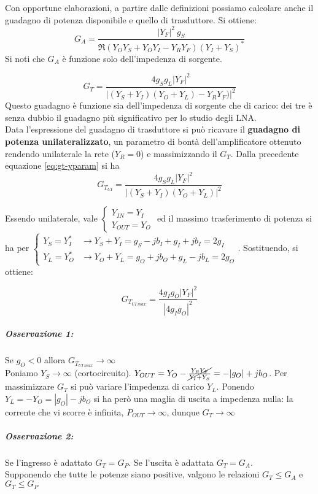 Con opportune elaborazioni, a partire dalle definizioni possiamo calcolare anche il guadagno di potenza disponibile e quello di trasduttore. Si ottiene:
      \[G_A = \frac{|Y_F|^2 ~ g_S}{\Re{ (Y_O Y_S + Y_O Y_I - Y_R Y_F)(Y_I + Y_S)^*}}\]
      Si noti che $G_A$ è funzione solo dell'impedenza di sorgente.
      
\begin{equation}
G_T = \frac{4 g_S g_L |Y_F|^2}{|(Y_S + Y_I) (Y_O + Y_L) - Y_R Y_F)|^2}
\label{eq:gt-yparam}
\end{equation}
  Questo guadagno è funzione sia dell'impedenza di sorgente che di carico: dei tre è senza dubbio il guadagno più significativo per lo studio degli LNA.
  \\Data l'espressione del guadagno di trasduttore si può ricavare il \textbf{guadagno di potenza unilateralizzato}, un parametro di bontà dell'amplificatore ottenuto rendendo unilaterale la rete ($Y_R = 0$) e massimizzando il $G_T$. Dalla precedente equazione \ref{eq:gt-yparam} si ha
\[G_{T_{UI}} = \frac{4 g_S g_L |Y_F|^2}{|(Y_S + Y_I) (Y_O + Y_L)|^2}\]

Essendo unilaterale, vale
$\begin{cases} Y_{IN} = Y_I \\
Y_{OUT} = Y_O \end{cases}$	ed il massimo trasferimento di potenza si ha per
$\begin{cases}
Y_S = Y_I^* &
\rightarrow
Y_S + Y_I = g_S - jb_I + g_I + jb_I = 2g_I
\\
Y_L = Y_O^* &
\rightarrow
Y_O + Y_L = g_O + jb_O + g_L - jb_L = 2g_O\end{cases}$.
Sostituendo, si ottiene:

$$G_{T_{UI ~ max}} = \frac{4 g_I g_O |Y_F|^2}{|4 g_I g_O|^2}$$


\subparagraph{Osservazione 1:} Se $g_O < 0$ allora $G_{T_{UI ~ max}} \rightarrow \infty$
\\
Poniamo $Y_S \rightarrow \infty$ (cortocircuito). $Y_{OUT} = Y_O - \cancel{ \frac{Y_R Y_F}{Y_I + Y_S} } = - |g_O| + jb_O$. Per massimizzare $G_T$ si può variare l'impedenza di carico $Y_L$. Ponendo $Y_L = -Y_O = |g_O| - jb_O$ si ha però una maglia di uscita a impedenza nulla: la corrente che vi scorre è infinita, $P_{OUT} \rightarrow \infty$, dunque $G_T \rightarrow \infty$

\subparagraph{Osservazione 2:} Se l'ingresso è adattato $G_T = G_P$. Se l'uscita è adattata $G_T = G_A$.\\
Supponendo che tutte le potenze siano positive, valgono le relazioni $G_T \leqslant G_A$ e $G_T \leqslant G_P$

